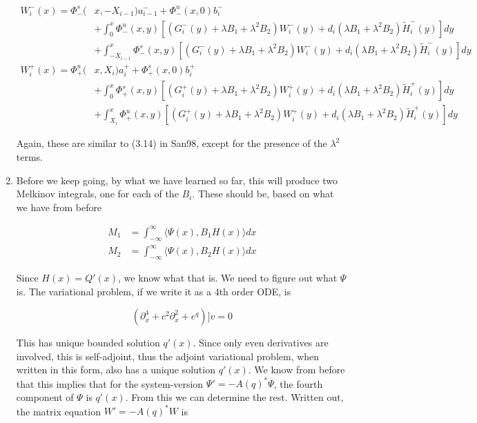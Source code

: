 \documentclass[12pt]{article}
\begin{document}
\begin{enumerate}
\begin{align*}
W_i^-(x) = \Phi_-^s(&x, -X_{i-1})a_{i-1}^- + \Phi_-^u(x, 0)b_i^- \\
&+ \int_0^x \Phi_-^u(x, y)[(G_i^-(y) + \lambda B_1 + \lambda^2 B_2) W_i^-(y) + d_i (\lambda B_1 + \lambda^2 B_2) \tilde{H}_i^-(y) ] dy \\
&+ \int_{-X_{i-1}}^x \Phi_-^s(x, y)[(G_i^-(y) + \lambda B_1 + \lambda^2 B_2) W_i^-(y) + d_i (\lambda B_1 + \lambda^2 B_2) \tilde{H}_i^-(y) ] dy \\
W_i^+(x) = \Phi_+^u(&x, X_i)a_i^+ + \Phi_+^s(x, 0)b_i^+ \\
&+ \int_0^x \Phi_+^s(x, y)[(G_i^+(y) + \lambda B_1 + \lambda^2 B_2) W_i^+(y) + d_i (\lambda B_1 + \lambda^2 B_2) \tilde{H}_i^+(y) ] dy \\
&+ \int_{X_i}^x \Phi_+^u(x, y) [(G_i^+(y) + \lambda B_1 + \lambda^2 B_2) W_i^+(y) + d_i (\lambda B_1 + \lambda^2 B_2) \tilde{H}_i^+(y) ] dy
\end{align*}

Again, these are similar to (3.14) in San98, except for the presence of the $\lambda^2$ terms.\\

\item Before we keep going, by what we have learned so far, this will produce two Melkinov integrals, one for each of the $B_i$. These should be, based on what we have from before

\begin{align*}
M_1 &= \int_{-\infty}^\infty \langle \Psi(x), B_1 H(x) \rangle dx \\
M_2 &= \int_{-\infty}^\infty \langle \Psi(x), B_2 H(x) \rangle dx
\end{align*}

Since $H(x) = Q'(x)$, we know what that is. We need to figure out what $\Psi$ is. The variational problem, if we write it as a 4th order ODE, is

\[
(\partial_x^4 + c^2 \partial_x^2 + e^{q})]v = 0
\]

This has unique bounded solution $q'(x)$. Since only even derivatives are involved, this is self-adjoint, thus the adjoint variational problem, when written in this form, also has a unique solution $q'(x)$. We know from before that this implies that for the system-version $\Psi' = -A(q)^* \Psi$, the fourth component of $\Psi$ is $q'(x)$. From this we can determine the rest. Written out, the matrix equation $W' = -A(q)^* W$ is


\end{enumerate}
\end{document}
